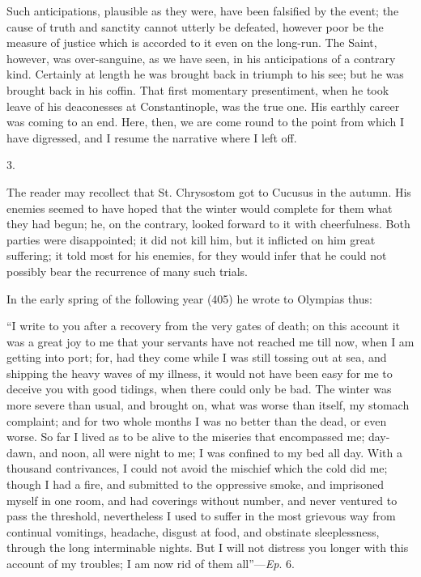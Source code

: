 Such anticipations, plausible as they were, have been falsified by
the event; the cause of truth and sanctity cannot utterly be defeated,
however poor be the measure of justice which is accorded to it even on
the long-run. The Saint, however, was over-sanguine, as we have seen,
in his anticipations of a contrary kind. Certainly at length he was
brought back in triumph to his see; but he was brought back in his
coffin. That first momentary presentiment, when he took leave of his
deaconesses at Constantinople, was the true one. His earthly career
was coming to an end. Here, then, we are come round to the point from
which I have digressed, and I resume the narrative where I left off.

3.

The reader may recollect that St. Chrysostom got to Cucusus in the
autumn. His enemies seemed to have hoped that the winter would
complete for them what they had begun; he, on the contrary, looked
forward to it with cheerfulness. Both parties were disappointed; it
did not kill him, but it inflicted on him great suffering; it told
most for his enemies, for they would infer that he could not possibly
bear the recurrence of many such trials.

In the early spring of the following year (405) he wrote to
Olympias thus:

``I write to you after a recovery from the very gates of death;
on this account it was a great joy to me that your servants have not
reached me till now, when I am getting into port; for, had they come
while I was still tossing out at sea, and shipping the heavy waves of
my illness, it would not have been easy for me to deceive you with
good tidings, when there could only be bad. The winter was more severe
than usual, and brought on, what was worse than itself, my stomach
complaint; and for two whole months I was no better than the dead, or
even worse. So far I lived as to be alive to the miseries that
encompassed me; day-dawn, and noon, all were night to me; I was
confined to my bed all day. With a thousand contrivances, I could not
avoid the mischief which the cold did me; though I had a fire, and
submitted to the oppressive smoke, and imprisoned myself in one room,
and had coverings without number, and never ventured to pass the
threshold, nevertheless I used to suffer in the most grievous way from
continual vomitings, headache, disgust at food, and obstinate
sleeplessness, through the long interminable nights. But I will not
distress you longer with this account of my troubles; I am now rid of
them all''—\emph{Ep}. 6.

